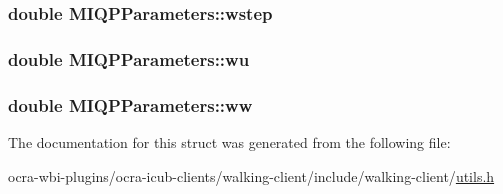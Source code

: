 \hypertarget{structMIQPParameters_a284df9b565513a826e92098f0a23f5cc}{
\subsubsection[{wstep}]{\setlength{\rightskip}{0pt plus 5cm}double {\bf \-M\-I\-Q\-P\-Parameters\-::wstep}}}\label{structMIQPParameters_a284df9b565513a826e92098f0a23f5cc}
\hypertarget{structMIQPParameters_aed141afdcc25904d53526a5f2c977427}{
\subsubsection[{wu}]{\setlength{\rightskip}{0pt plus 5cm}double {\bf \-M\-I\-Q\-P\-Parameters\-::wu}}}\label{structMIQPParameters_aed141afdcc25904d53526a5f2c977427}
\hypertarget{structMIQPParameters_a7223a1cda1e4565d18729f1e7bba87e0}{
\subsubsection[{ww}]{\setlength{\rightskip}{0pt plus 5cm}double {\bf \-M\-I\-Q\-P\-Parameters\-::ww}}}\label{structMIQPParameters_a7223a1cda1e4565d18729f1e7bba87e0}


\-The documentation for this struct was generated from the following file\-:\begin{DoxyCompactItemize}
\item 
ocra-\/wbi-\/plugins/ocra-\/icub-\/clients/walking-\/client/include/walking-\/client/\hyperlink{utils_8h}{utils.\-h}\end{DoxyCompactItemize}
